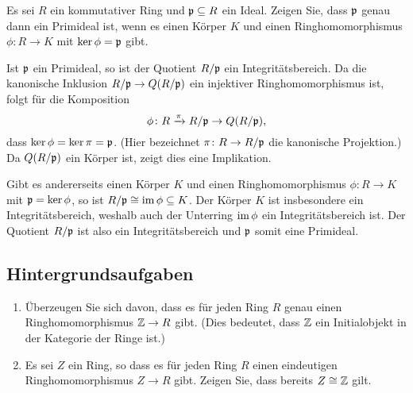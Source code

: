 \begin{question}[subtitle = Charakterisierung von Primidealen]
  Es sei $R$ ein kommutativer Ring und $\mathfrak{p} \subseteq R$ ein Ideal.
  Zeigen Sie, dass $\mathfrak{p}$ genau dann ein Primideal ist, wenn es einen Körper $K$ und einen Ringhomomorphismus $\phi \colon R \to K$ mit $\ker \phi = \mathfrak{p}$ gibt.
\end{question}


\begin{solution}
  Ist $\mathfrak{p}$ ein Primideal, so ist der Quotient $R/\mathfrak{p}$ ein Integritätsbereich.
  Da die kanonische Inklusion $R/\mathfrak{p} \to Q(R/\mathfrak{p})$ ein injektiver Ringhomomorphismus ist, folgt für die Komposition
  \[
    \phi \colon R \xrightarrow{\pi} R/\mathfrak{p} \to Q(R/\mathfrak{p}),
  \]
  dass $\ker \phi = \ker \pi = \mathfrak{p}$.
  (Hier bezeichnet $\pi \colon R \to R/\mathfrak{p}$ die kanonische Projektion.)
  Da $Q(R/\mathfrak{p})$ ein Körper ist, zeigt dies eine Implikation.
  
  Gibt es andererseits einen Körper $K$ und einen Ringhomomorphismus $\phi \colon R \to K$ mit $\mathfrak{p} = \ker \phi$, so ist $R/\mathfrak{p} \cong \operatorname{im} \phi \subseteq K$.
  Der Körper $K$ ist insbesondere ein Integritätsbereich, weshalb auch der Unterring $\operatorname{im} \phi$ ein Integritätsbereich ist.
  Der Quotient $R/\mathfrak{p}$ ist also ein Integritätsbereich und $\mathfrak{p}$ somit eine Primideal.
\end{solution}





\subsection{Hintergrundsaufgaben}


\begin{question}[subtitle = Initialobjekte in der Kategorie der Ringe]
  \label{qst: Z is inital}
  \begin{enumerate}
    \item
      Überzeugen Sie sich davon, dass es für jeden Ring $R$ genau einen Ringhomomorphismus $\mathbb{Z} \to R$ gibt.
      (Dies bedeutet, dass $\mathbb{Z}$ ein Initialobjekt in der Kategorie der Ringe ist.)
    \item
      Es sei $Z$ ein Ring, so dass es für jeden Ring $R$ einen eindeutigen Ringhomomorphismus $Z \to R$ gibt.
      Zeigen Sie, dass bereits $Z \cong \mathbb{Z}$ gilt.
  \end{enumerate}
\end{question}


